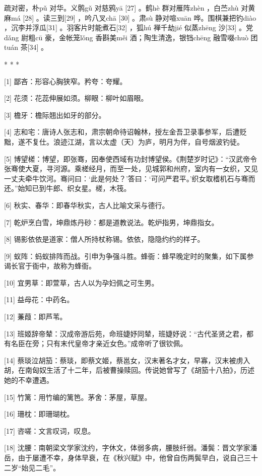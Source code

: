 \documentclass[12pt,UTF8]{ctexbook}
\begin{document}
疏对密，朴pǔ 对华。义鹘gǔ 对慈鸦yā [27] 。鹤hè 群对雁阵zhèn ，白苎zhù 对黄麻má [28] 。读三到[29] ，吟八叉chā [30] 。肃sù 静对喧xuān 哗。围棋兼把钓diào ，沉李并浮瓜[31] 。羽客片时能煮石[32] ，狐hú 禅千劫jié 似蒸zhēng 沙[33] 。党dǎng 尉粗cū 豪，金帐笼lǒng 香斟美měi 酒；陶生清逸，银铛chēng 融雪啜chuò 团tuán 茶[34] 。



* * *



[1] 鄙吝：形容心胸狭窄。矜夸：夸耀。

[2] 花须：花蕊伸展如须。柳眼：柳叶如眉眼。

[3] 檐牙：檐际翘出如牙的部分。

[4] 志和宅：唐诗人张志和，肃宗朝命待诏翰林，授左金吾卫录事参军，后遭贬黜，遂不复仕。浪迹江湖，言以太虚（天）为庐，明月为伴，自号烟波钓徒。

[5] 博望槎：博望，即张骞，因奉使西域有功封博望侯。《荆楚岁时记》：“汉武帝令张骞使大夏，寻河源。乘槎经月，而至一处，见城郭和州府，室内有一女织，又见一丈夫牵牛饮河。骞问曰：‘此是何处？’答曰：‘可问严君平。’织女取榰机石与骞而还。”始知已到牛郎、织女星。槎，木筏。

[6] 秋实、春华：即春华秋实，古人比喻文采与德行。

[7] 乾炉烹白雪，坤鼎炼丹砂：都是道教说法。乾炉指男，坤鼎指女。

[8] 锡影依依是道家：僧人所持杖称锡。依依，隐隐约约的样子。

[9] 蚁阵：蚂蚁排阵而战。引申为争强斗胜。蜂衙：蜂早晚定时的聚集，如下属参谒长官于衙中，故称为蜂衙。

[10] 宜男草：即萱草，古人以为孕妇佩之可生男。

[11] 益母花：中药名。

[12] 蒹葭：即芦苇。

[13] 班姬辞帝辇：汉成帝游后苑，命班婕妤同辇，班婕妤说：“古代圣贤之君，都有名臣在旁；只有末代皇帝才亲近女色。”成帝听了很钦佩。

[14] 蔡琰泣胡笳：蔡琰，即蔡文姬，蔡邕女，汉末著名才女，早寡，汉末被虏入胡，在南匈奴生活了十二年，后被曹操赎回。传说她曾写了《胡笳十八拍》，历述她的不幸遭遇。

[15] 竹篱：用竹编的篱笆。茅舍：茅屋，草屋。

[16] 珊枕：即珊瑚枕。

[17] 咨嗟：文言叹词，叹息。

[18] 沈腰：南朝梁文学家沈约，字休文，体弱多病，腰肢纤弱。潘鬓：晋文学家潘岳，由于屡遭不幸，身体早衰，在《秋兴赋》中，他曾自伤两鬓早白，说自己三十二岁“始见二毛”。
\end{document}

